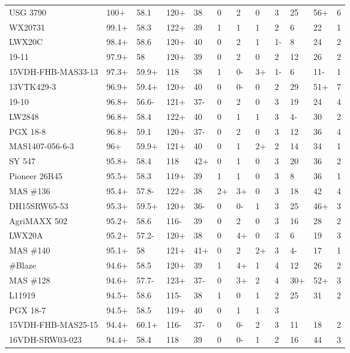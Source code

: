 \documentclass[12pt, letterpaper]{article}
\begin{document}
\begin{landscape}
\begin{ThreePartTable}
\begin{longtable}{llllllllllll}
  USG 3790 & 100+ & 58.1 & 120+ & 38 & 0 & 2 & 0 & 3 & 25 & 56+ & 6 \\ 
  WX20731 & 99.1+ & 58.3 & 122+ & 39 & 1 & 1 & 1 & 2 & 6 & 22 & 1 \\ 
  LWX20C & 98.4+ & 58.6 & 120+ & 40 & 0 & 2 & 1 & 1- & 8 & 24 & 2 \\ 
  19-11 & 97.9+ & 58 & 120+ & 39 & 0 & 2 & 0 & 2 & 12 & 26 & 2 \\ 
  15VDH-FHB-MAS33-13 & 97.3+ & 59.9+ & 118 & 38 & 1 & 0- & 3+ & 1- & 6 & 11- & 1 \\ 
  13VTK429-3 & 96.9+ & 59.4+ & 120+ & 40 & 0 & 0- & 0 & 2 & 29 & 51+ & 7 \\ 
  19-10 & 96.8+ & 56.6- & 121+ & 37- & 0 & 2 & 0 & 3 & 19 & 24 & 4 \\ 
  LW2848 & 96.8+ & 58.4 & 122+ & 40 & 0 & 1 & 1 & 3 & 4- & 30 & 2 \\ 
  PGX 18-8 & 96.8+ & 59.1 & 120+ & 37- & 0 & 2 & 0 & 3 & 12 & 36 & 4 \\ 
  MAS1407-056-6-3 & 96+ & 59.9+ & 121+ & 40 & 0 & 1 & 2+ & 2 & 14 & 34 & 1 \\ 
  SY 547 & 95.8+ & 58.4 & 118 & 42+ & 0 & 1 & 0 & 3 & 20 & 36 & 2 \\ 
  Pioneer 26R45 & 95.5+ & 58.3 & 119+ & 39 & 1 & 1 & 0 & 3 & 8 & 36 & 1 \\ 
  MAS \#136 & 95.4+ & 57.8- & 122+ & 38 & 2+ & 3+ & 0 & 3 & 18 & 42 & 4 \\ 
  DH15SRW65-53 & 95.3+ & 59.5+ & 120+ & 36- & 0 & 0- & 1 & 3 & 25 & 46+ & 3 \\ 
  AgriMAXX 502 & 95.2+ & 58.6 & 116- & 39 & 0 & 2 & 0 & 3 & 16 & 28 & 2 \\ 
  LWX20A & 95.2+ & 57.2- & 120+ & 38 & 0 & 4+ & 0 & 3 & 6 & 19 & 3 \\ 
  MAS \#140 & 95.1+ & 58 & 121+ & 41+ & 0 & 2 & 2+ & 3 & 4- & 17 & 1 \\ 
  \#Blaze & 94.6+ & 58.5 & 120+ & 39 & 1 & 4+ & 1 & 4 & 12 & 26 & 2 \\ 
  MAS \#128 & 94.6+ & 57.7- & 123+ & 37- & 0 & 3+ & 2 & 4 & 30+ & 52+ & 3 \\ 
  L11919 & 94.5+ & 58.6 & 115- & 38 & 1 & 0 & 1 & 2 & 25 & 31 & 2 \\ 
  PGX 18-7 & 94.5+ & 58.5 & 119+ & 40 & 0 & 1 & 1 & 3 &  &  &  \\ 
  15VDH-FHB-MAS25-15 & 94.4+ & 60.1+ & 116- & 37- & 0 & 0- & 2 & 3 & 11 & 18 & 2 \\ 
  16VDH-SRW03-023 & 94.4+ & 58.4 & 118 & 39 & 0 & 0- & 1 & 2 & 16 & 44 & 3 \\ 

\end{longtable}
\end{ThreePartTable}
\end{landscape}
\end{document}
